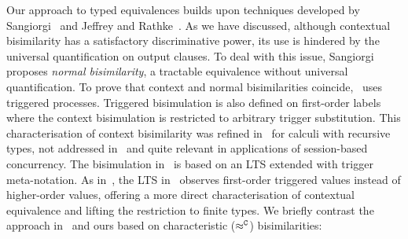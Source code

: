 Our approach %
to typed equivalences
builds upon techniques developed by Sangiorgi~\cite{SangiorgiD:expmpa,San96H}
and Jeffrey and Rathke~\cite{JeffreyR05}.
As we have discussed, although contextual bisimilarity has a satisfactory discriminative power,
its use is hindered by the universal quantification on output clauses.
To deal with this issue, 
Sangiorgi proposes \emph{normal bisimilarity}, 
a tractable  equivalence without universal quantification. 
To prove that context and normal bisimilarities coincide,~\cite{SangiorgiD:expmpa} uses 
triggered processes.
Triggered bisimulation is also defined on first-order labels
where the context bisimulation is restricted to arbitrary
trigger substitution. %
This
characterisation of context bisimilarity  was refined in~\cite{JeffreyR05} for
calculi with recursive types, not addressed in~\cite{San96H,SangiorgiD:expmpa} and
quite relevant in %
applications of session-based concurrency.
The
bisimulation in~\cite{JeffreyR05}
is based on an LTS  extended with trigger meta-notation.
As in~\cite{San96H,SangiorgiD:expmpa}, 
the LTS in~\cite{JeffreyR05}
observes first-order triggered values instead of
higher-order values, offering a more direct characterisation of contextual equivalence
and lifting the restriction to finite types.
We briefly contrast 
the approach in~\cite{JeffreyR05} and ours based on 
characteristic ($\approx^\mathtt{C}$) bisimilarities:
